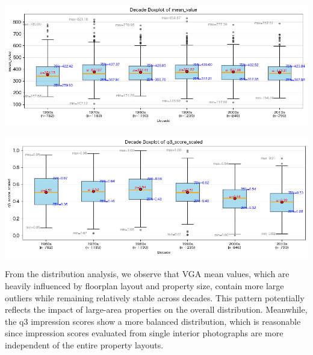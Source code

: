 \documentclass[11pt,a4paper]{article}
\begin{document}
\begin{multicols}{2}
\begin{flushleft}
    \includegraphics[width=0.9\columnwidth]{plots/vga_10years_box.png}
    \label{fig:vga_10years_box}
\end{flushleft}
\begin{flushleft}
    \includegraphics[width=0.9\columnwidth]{plots/q3_10years_box.png}
    \label{fig:q3_10years_box}
\end{flushleft}

From the distribution analysis, we observe that VGA mean values, which are heavily influenced by floorplan layout and property size, 
contain more large outliers while remaining relatively stable across decades. This pattern potentially reflects the impact of large-area properties 
on the overall distribution. Meanwhile, the q3 impression scores show a more balanced distribution, 
which is reasonable since impression scores evaluated from single interior photographs are more independent of the entire property layouts.


\end{multicols}
\end{document}
